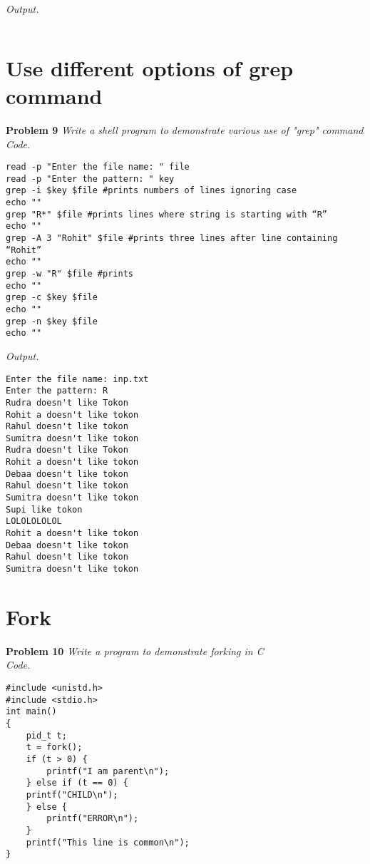\documentclass[12pt]{article}
\begin{document}
\textit{Output.}
\begin{lstlisting}

\end{lstlisting}

\section{Use different options of grep command}

\textbf{Problem 9} \textit{Write a shell program to demonstrate various use of "grep" command}\\

\textit{Code.}

\begin{lstlisting}
read -p "Enter the file name: " file
read -p "Enter the pattern: " key
grep -i $key $file #prints numbers of lines ignoring case
echo ""
grep "R*" $file #prints lines where string is starting with “R”
echo ""
grep -A 3 "Rohit" $file #prints three lines after line containing “Rohit”
echo ""
grep -w "R" $file #prints
echo ""
grep -c $key $file
echo ""
grep -n $key $file
echo ""
\end{lstlisting}

\textit{Output.}
\begin{lstlisting}
Enter the file name: inp.txt
Enter the pattern: R
Rudra doesn't like Tokon
Rohit a doesn't like tokon
Rahul doesn't like tokon
Sumitra doesn't like tokon
Rudra doesn't like Tokon
Rohit a doesn't like tokon
Debaa doesn't like tokon
Rahul doesn't like tokon
Sumitra doesn't like tokon
Supi like tokon
LOLOLOLOLOL
Rohit a doesn't like tokon
Debaa doesn't like tokon
Rahul doesn't like tokon
Sumitra doesn't like tokon
\end{lstlisting}

\section{Fork}

\textbf{Problem 10} \textit{Write a program to demonstrate forking in C}\\

\textit{Code.}

\begin{lstlisting}
#include <unistd.h>
#include <stdio.h>
int main()
{
	pid_t t;
	t = fork();
	if (t > 0) {
		printf("I am parent\n");
	} else if (t == 0) {
	printf("CHILD\n");
	} else {
		printf("ERROR\n");
	}
	printf("This line is common\n");
}
\end{lstlisting}
\end{document}
